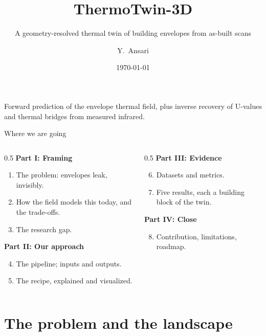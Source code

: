 \documentclass[aspectratio=169]{beamer}
\title[ThermoTwin-3D]{ThermoTwin-3D}
\subtitle{A geometry-resolved thermal twin of building envelopes from as-built scans}
\author{Y.\ Ansari}
\institute{Project progress review}
\date{\today}
\begin{document}
\begin{frame}[plain]
  \titlepage
  \begin{center}\small
    Forward prediction of the envelope thermal field, plus inverse recovery of
    U-values and thermal bridges from measured infrared.
  \end{center}
\end{frame}

\begin{frame}{Where we are going}
  \small
  \begin{columns}[T]
    \begin{column}{0.5\textwidth}
      \textbf{Part I: Framing}
      \begin{enumerate}
        \item The problem: envelopes leak, invisibly.
        \item How the field models this today, and the trade-offs.
        \item The research gap.
      \end{enumerate}
      \textbf{Part II: Our approach}
      \begin{enumerate}\setcounter{enumi}{3}
        \item The pipeline; inputs and outputs.
        \item The recipe, explained and visualized.
      \end{enumerate}
    \end{column}
    \begin{column}{0.5\textwidth}
      \textbf{Part III: Evidence}
      \begin{enumerate}\setcounter{enumi}{5}
        \item Datasets and metrics.
        \item Five results, each a building block of the twin.
      \end{enumerate}
      \textbf{Part IV: Close}
      \begin{enumerate}\setcounter{enumi}{7}
        \item Contribution, limitations, roadmap.
      \end{enumerate}
    \end{column}
  \end{columns}
\end{frame}

\section{The problem and the landscape}
\end{document}
